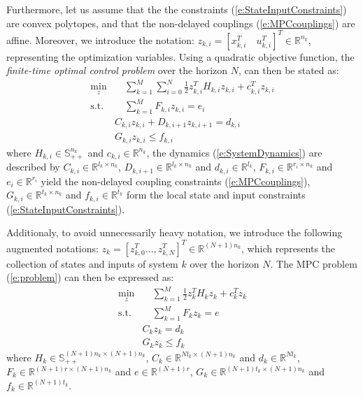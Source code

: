 Furthermore, let us assume that the the constraints (\ref{e:StateInputConstraints}) are convex polytopes, and that the non-delayed couplings (\ref{e:MPCcouplings}) are affine. Moreover, we introduce the notation: $z_{k,i} = [x_{k,i}^T \quad u_{k,i}^T]^T \in \mathbb{R}^{n_{k}}$, representing the optimization variables. Using a quadratic objective function, the \emph{finite-time optimal control problem} over the horizon $N$, can then be stated as:
\begin{subequations}
\label{e:problem}
\begin{align}
\min_z & \quad \sum_{k=1}^{M} \sum_{i=0}^N \frac{1}{2}z_{k,i}^TH_{k,i}z_{k,i} + c_{k,i}^Tz_{k,i} \label{e:1} \\
\text{s.t.} & \quad \sum_{k=1}^{M} F_{k,i}z_{k,i} = e_i \label{e:CoupConstControl} \\
& C_{k,i}z_{k,i} + D_{k,i+1}z_{k,i+1} = d_{k,i} \label{e:dynamics} \\
& G_{k,i}z_{k,i} \leq f_{k,i}
\end{align}
\end{subequations}
where $H_{k,i} \in \mathbb{S}_{++}^{n_{k}}$ and $c_{k,i} \in \mathbb{R}^{n_k}$, the dynamics (\ref{e:SystemDynamics}) are described by $C_{k,i} \in \mathbb{R}^{l_{k} \times n_{k}}$, $D_{k,i+1} \in \mathbb{R}^{l_{k} \times n_{k}}$ and $d_{k,i} \in \mathbb{R}^{l_{k}}$, $F_{k,i} \in \mathbb{R}^{r_{i} \times n_{k}}$ and $e_i \in \mathbb{R}^{r_i}$ yield the non-delayed coupling constraints (\ref{e:MPCcouplings}), $G_{k,i} \in \mathbb{R}^{t_{k} \times n_{k}}$ and $f_{k,i} \in \mathbb{R}^{t_{k}}$ form the local state and input constraints (\ref{e:StateInputConstraints}).

Additionaly, to avoid unnecessarily heavy notation, we introduce the following augmented notations: $z_k = [z_{k,0}^T \dots, z_{k,N}^T]^T \in \mathbb{R}^{(N+1)n_k}$, which represents the collection of states and inputs of system $k$ over the horizon $N$. The MPC problem (\ref{e:problem}) can then be expressed as:
\begin{subequations}
\label{e:problem1}
\begin{align}
\min_z & \quad \sum_{k=1}^{M} \frac{1}{2}z_k^TH_k z_k + c_k^Tz_k \label{e:1} \\
\text{s.t.} & \quad \sum_{k=1}^{M} F_k z_k = e \label{e:CoupConst} \\
& C_k z_k = d_k \label{e:3} \\
& G_k z_k \leq f_k \label{e:ineqConst}
\end{align}
\end{subequations}
where $H_{k} \in \mathbb{S}_{++}^{(N+1)n_{k} \times (N+1)n_{k}}$, $C_{k} \in \mathbb{R}^{N l_{k} \times (N+1)n_{k}}$ and $d_{k} \in \mathbb{R}^{N l_{k}}$, $F_{k} \in \mathbb{R}^{(N+1) r \times (N+1) n_{k}}$ and $e \in \mathbb{R}^{(N+1)r}$, $G_{k} \in \mathbb{R}^{(N+1) t_{k} \times (N+1) n_{k}}$ and $f_{k} \in \mathbb{R}^{(N+1) t_{k}}$.

